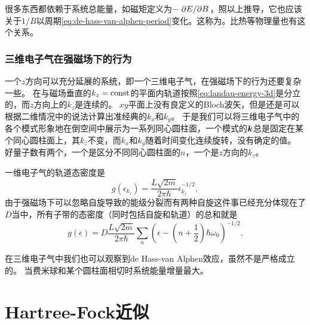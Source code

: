 很多东西都依赖于系统总能量，如磁矩定义为$- \pdv*{E}{B}$，照以上推导，它也应该关于$1/B$以周期\eqref{eq:de-hass-van-alphen-period}变化。这称为。比热等物理量也有这个关系。


\subsubsection{三维电子气在强磁场下的行为}

一个$z$方向可以充分延展的系统，即一个三维电子气，在强磁场下的行为还要复杂一些。
在与磁场垂直的$k_z=\mathrm{const}$的平面内轨道按照\eqref{eq:landau-energy-3d}是分立的，而$z$方向上的$k_z$是连续的。
$xy$平面上没有良定义的Bloch波矢，但是还是可以根据二维情况中的说法计算出准经典的$k_x$和$k_y$。
于是我们可以将三维电子气中的各个模式形象地在倒空间中展示为一系列同心圆柱面，一个模式的$\vb*{k}$总是固定在某个同心圆柱面上，其$k_z$不变，而$k_x$和$k_y$随着时间变化连续旋转，没有确定的值。
好量子数有两个，一个是区分不同同心圆柱面的$n$，一个是$z$方向的$k_z$。

一维电子气的轨道态密度是
\begin{equation}
    g(\epsilon_{k_z}) = \frac{L \sqrt{2m}}{2 \pi \hbar} \epsilon_{k_z}^{-1/2},
\end{equation}
由于强磁场下可以忽略自旋导致的能级分裂而有两种自旋这件事已经充分体现在了$D$当中，所有子带的态密度（同时包括自旋和轨道）的总和就是
\begin{equation}
    g(\epsilon) = D \frac{L \sqrt{2m}}{2 \pi \hbar} \sum_n \left(\epsilon - \left( n + \frac{1}{2} \right) \hbar \omega_0 \right)^{-1/2}.
\end{equation}

在三维电子气中我们也可以观察到de Hass-van Alphen效应，虽然不是严格成立的。
当费米球和某个圆柱面相切时系统能量增量最大。

\section{Hartree-Fock近似}

